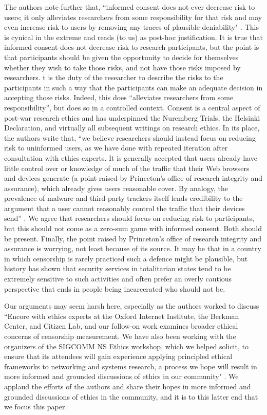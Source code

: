 \documentclass{svjour3}                     %
\begin{document}
The authors note further that, ``informed consent does not ever decrease risk to users; it only alleviates researchers from some responsibility for that risk and may even increase risk to users by removing any traces of plausible deniability" \cite[p.~664]{burnett2015encore}. This is cynical in the extreme and reads (to us) as post-hoc justification.  It is true that informed consent does not decrease risk to research participants, but the point is that participants should be given the opportunity to decide for themselves whether they wish to take those risks, and not have those risks imposed by researchers. t is the duty of the researcher to describe the risks to the participants in such a way that the participants can make an adequate decision in accepting those risks. Indeed, this does ``alleviates researchers from some responsibility'', but does so in a controlled context.  Consent is a central aspect of post-war research ethics and has underpinned the Nuremberg Trials, the Helsinki Declaration, and virtually all subsequent writings on research ethics.  In its place, the authors write that, ``we believe researchers should instead focus on reducing risk to uninformed users, as we have done with repeated iteration after consultation with ethics experts. It is generally accepted that users already have little control over or knowledge of much of the traffic that their Web browsers and devices generate (a point raised by Princeton’s office of research integrity and assurance), which already gives users reasonable cover. By analogy, the prevalence of malware and third-party trackers itself lends credibility to the argument that a user cannot reasonably control the traffic that their devices send'' \cite[p.~664-65]{burnett2015encore}. We agree that researchers should focus on reducing risk to participants, but this should not come as a zero-sum game with informed consent.  Both should be present. Finally, the point raised by Princeton's office of research integrity and assurance is worrying, not least because of its source.  It may be that in a country in which censorship is rarely practiced such a defence might be plausible, but history has shown that security services in totalitarian states tend to be extremely sensitive to such activities and often prefer an overly cautious perspective that ends in people being incarcerated who should not be.

Our arguments may seem harsh here, especially as the authors worked to discuss ``Encore with ethics experts at the Oxford Internet Institute, the Berkman Center, and Citizen Lab, and our follow-on work examines broader ethical concerns of censorship measurement. We have also been working with the organizers of the SIGCOMM NS Ethics workshop, which we helped solicit, to ensure that its attendees will gain experience applying principled ethical frameworks to networking and systems research, a process we hope will result in more informed and grounded discussions of ethics in our community" \cite[p.~664]{burnett2015encore}. We applaud the efforts of the authors and share their hopes in more informed and grounded discussions of ethics in the community, and it is to this latter end that we focus this paper.
\end{document}
